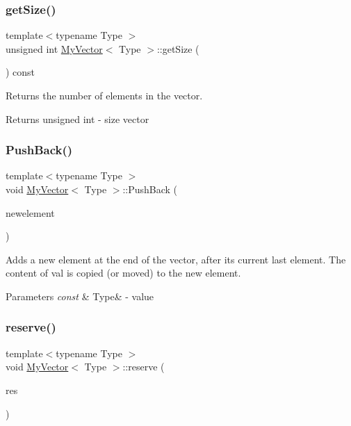 \subsubsection{\texorpdfstring{get\+Size()}{getSize()}}
{\footnotesize\ttfamily template$<$typename Type $>$ \\
unsigned int \hyperlink{classMyVector}{My\+Vector}$<$ Type $>$\+::get\+Size (\begin{DoxyParamCaption}\item[{void}]{ }\end{DoxyParamCaption}) const}



Returns the number of elements in the vector. 

\begin{DoxyReturn}{Returns}
unsigned int -\/ size vector 
\end{DoxyReturn}
\mbox{\label{classMyVector_a9e3b2952308f179196339693d16df039}} 
\subsubsection{\texorpdfstring{Push\+Back()}{PushBack()}}
{\footnotesize\ttfamily template$<$typename Type $>$ \\
void \hyperlink{classMyVector}{My\+Vector}$<$ Type $>$\+::Push\+Back (\begin{DoxyParamCaption}\item[{const Type \&}]{newelement }\end{DoxyParamCaption})}



Adds a new element at the end of the vector, after its current last element. The content of val is copied (or moved) to the new element. 


\begin{DoxyParams}{Parameters}
{\em const} & Type\& -\/ value \\
\hline
\end{DoxyParams}
\mbox{\label{classMyVector_a8793cd4a1ec1df2104f20d7b3fda2c7a}} 
\subsubsection{\texorpdfstring{reserve()}{reserve()}}
{\footnotesize\ttfamily template$<$typename Type $>$ \\
void \hyperlink{classMyVector}{My\+Vector}$<$ Type $>$\+::reserve (\begin{DoxyParamCaption}\item[{unsigned int}]{res }\end{DoxyParamCaption})}



